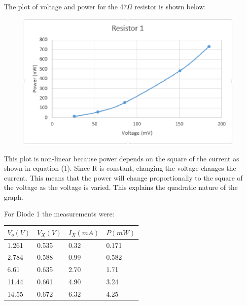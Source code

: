 \documentclass[twocolumn, amsmath]{revtex4}
\begin{document}
The plot of voltage and power for the 47$\Omega$ resistor is shown below:

\begin{figure}[h]  

\includegraphics[scale = 0.4]{powerresistor.eps}  
\end{figure}

This plot is non-linear because power depends on the square of the current as shown in equation (1). Since R is constant, changing the voltage changes the current. This means that the power will change proportionally to the square of the voltage as the voltage is varied. This explains the quadratic nature of the graph.


For Diode 1 the measurements were:

\begin{center}
    \begin{tabular}{| l | l | l | l |}
    \hline
    $V_{o} (V)$ & $V_{X} (V)$ & $I_{X} (mA)$ & $P (mW)$ \\ \hline
    
    1.261	& 0.535  	& 0.32  & 0.171 	 \\ \hline
    2.784	& 0.588  	& 0.99 	& 0.582	\\ \hline
    6.61	& 0.635  	& 2.70	& 1.71   \\ \hline
    11.44    	& 0.661  	& 4.90  & 3.24 	 \\ \hline
    14.55   	& 0.672    	& 6.32  & 4.25 	 	\\ 
    \hline
    \end{tabular}
\end{center}
\end{document}
